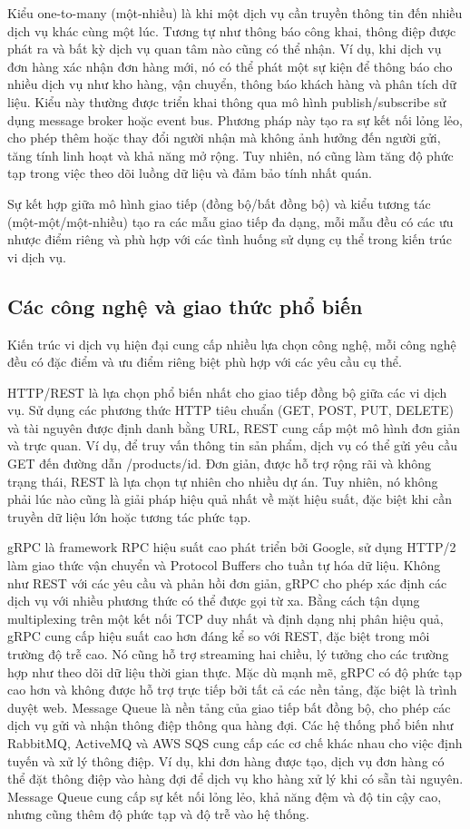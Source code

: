 Kiểu one-to-many (một-nhiều) là khi một dịch vụ cần truyền thông tin đến nhiều dịch vụ khác cùng một lúc. Tương tự như thông báo công khai, thông điệp được phát ra và bất kỳ dịch vụ quan tâm nào cũng có thể nhận. Ví dụ, khi dịch vụ đơn hàng xác nhận đơn hàng mới, nó có thể phát một sự kiện để thông báo cho nhiều dịch vụ như kho hàng, vận chuyển, thông báo khách hàng và phân tích dữ liệu. Kiểu này thường được triển khai thông qua mô hình publish/subscribe sử dụng message broker hoặc event bus. Phương pháp này tạo ra sự kết nối lỏng lẻo, cho phép thêm hoặc thay đổi người nhận mà không ảnh hưởng đến người gửi, tăng tính linh hoạt và khả năng mở rộng. Tuy nhiên, nó cũng làm tăng độ phức tạp trong việc theo dõi luồng dữ liệu và đảm bảo tính nhất quán.

Sự kết hợp giữa mô hình giao tiếp (đồng bộ/bất đồng bộ) và kiểu tương tác (một-một/một-nhiều) tạo ra các mẫu giao tiếp đa dạng, mỗi mẫu đều có các ưu nhược điểm riêng và phù hợp với các tình huống sử dụng cụ thể trong kiến trúc vi dịch vụ.

\subsection{Các công nghệ và giao thức phổ biến}
Kiến trúc vi dịch vụ hiện đại cung cấp nhiều lựa chọn công nghệ, mỗi công nghệ đều có đặc điểm và ưu điểm riêng biệt phù hợp với các yêu cầu cụ thể.

HTTP/REST là lựa chọn phổ biến nhất cho giao tiếp đồng bộ giữa các vi dịch vụ. Sử dụng các phương thức HTTP tiêu chuẩn (GET, POST, PUT, DELETE) và tài nguyên được định danh bằng URL, REST cung cấp một mô hình đơn giản và trực quan. Ví dụ, để truy vấn thông tin sản phẩm, dịch vụ có thể gửi yêu cầu GET đến đường dẫn /products/{id}. Đơn giản, được hỗ trợ rộng rãi và không trạng thái, REST là lựa chọn tự nhiên cho nhiều dự án. Tuy nhiên, nó không phải lúc nào cũng là giải pháp hiệu quả nhất về mặt hiệu suất, đặc biệt khi cần truyền dữ liệu lớn hoặc tương tác phức tạp.

gRPC là framework RPC hiệu suất cao phát triển bởi Google, sử dụng HTTP/2 làm giao thức vận chuyển và Protocol Buffers cho tuần tự hóa dữ liệu. Không như REST với các yêu cầu và phản hồi đơn giản, gRPC cho phép xác định các dịch vụ với nhiều phương thức có thể được gọi từ xa. Bằng cách tận dụng multiplexing trên một kết nối TCP duy nhất và định dạng nhị phân hiệu quả, gRPC cung cấp hiệu suất cao hơn đáng kể so với REST, đặc biệt trong môi trường độ trễ cao. Nó cũng hỗ trợ streaming hai chiều, lý tưởng cho các trường hợp như theo dõi dữ liệu thời gian thực. Mặc dù mạnh mẽ, gRPC có độ phức tạp cao hơn và không được hỗ trợ trực tiếp bởi tất cả các nền tảng, đặc biệt là trình duyệt web.
Message Queue là nền tảng của giao tiếp bất đồng bộ, cho phép các dịch vụ gửi và nhận thông điệp thông qua hàng đợi. Các hệ thống phổ biến như RabbitMQ, ActiveMQ và AWS SQS cung cấp các cơ chế khác nhau cho việc định tuyến và xử lý thông điệp. Ví dụ, khi đơn hàng được tạo, dịch vụ đơn hàng có thể đặt thông điệp vào hàng đợi để dịch vụ kho hàng xử lý khi có sẵn tài nguyên. Message Queue cung cấp sự kết nối lỏng lẻo, khả năng đệm và độ tin cậy cao, nhưng cũng thêm độ phức tạp và độ trễ vào hệ thống.

